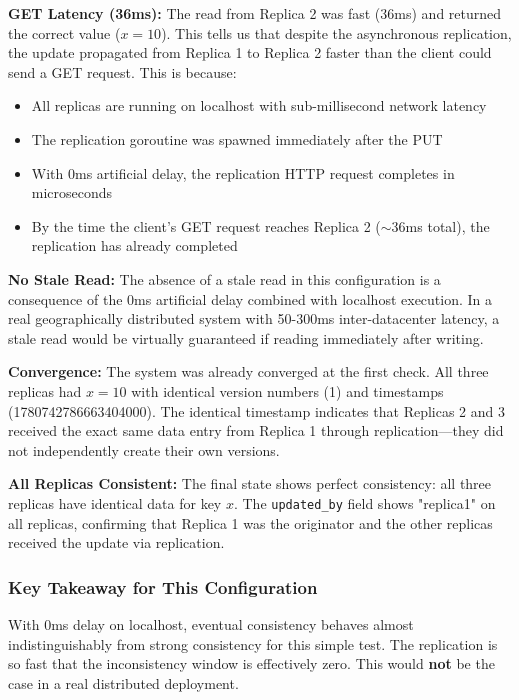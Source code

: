 \documentclass[10pt,a4paper]{article}
\begin{document}
\textbf{GET Latency (36ms):} The read from Replica 2 was fast (36ms) and returned the correct value ($x=10$). This tells us that despite the asynchronous replication, the update propagated from Replica 1 to Replica 2 faster than the client could send a GET request. This is because:
\begin{itemize}
    \item All replicas are running on localhost with sub-millisecond network latency
    \item The replication goroutine was spawned immediately after the PUT
    \item With 0ms artificial delay, the replication HTTP request completes in microseconds
    \item By the time the client's GET request reaches Replica 2 ($\sim$36ms total), the replication has already completed
\end{itemize}

\textbf{No Stale Read:} The absence of a stale read in this configuration is a consequence of the 0ms artificial delay combined with localhost execution. In a real geographically distributed system with 50-300ms inter-datacenter latency, a stale read would be virtually guaranteed if reading immediately after writing.

\textbf{Convergence:} The system was already converged at the first check. All three replicas had $x=10$ with identical version numbers (1) and timestamps (1780742786663404000). The identical timestamp indicates that Replicas 2 and 3 received the exact same data entry from Replica 1 through replication---they did not independently create their own versions.

\textbf{All Replicas Consistent:} The final state shows perfect consistency: all three replicas have identical data for key $x$. The \texttt{updated\_by} field shows "replica1" on all replicas, confirming that Replica 1 was the originator and the other replicas received the update via replication.

\subsubsection{Key Takeaway for This Configuration}

With 0ms delay on localhost, eventual consistency behaves almost indistinguishably from strong consistency for this simple test. The replication is so fast that the inconsistency window is effectively zero. This would \textbf{not} be the case in a real distributed deployment.
\end{document}
